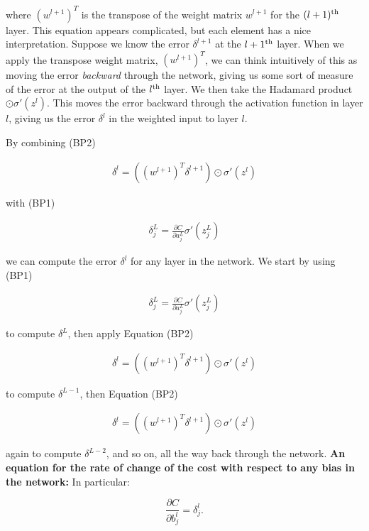 \noindent where $(w^{l+1})^T$ is the transpose of the weight matrix $w^{l+1}$ for the $(l+1)^{\rm th}$ layer. This equation appears complicated, but each element has a nice interpretation. Suppose we know the error $\delta^{l+1}$ at the $l+1^{\rm th}$ layer. When we apply the transpose weight matrix, $(w^{l+1})^T$, we can think intuitively of this as moving the error \emph{backward} through the network, giving us some sort of measure of the error at the output of the $l^{\rm th}$ layer. We then take the Hadamard product $\odot \sigma'(z^l)$. This moves the error backward through the activation function in layer $l$, giving us the error $\delta^l$ in the weighted input to layer $l$.


By combining (BP2)

\begin{align*}
\delta^l = ((w^{l+1})^T \delta^{l+1}) \odot \sigma'(z^l) \nonumber
\end{align*}

\noindent with (BP1)

\begin{align*}
\delta^L_j = \frac{\partial C}{\partial a^L_j} \sigma'(z^L_j) \nonumber
\end{align*}

\noindent we can compute the error $\delta^l$ for any layer in the network. We start by using (BP1)

\begin{align*}
\delta^L_j = \frac{\partial C}{\partial a^L_j} \sigma'(z^L_j) \nonumber
\end{align*}

\noindent to compute $\delta^L$, then apply Equation (BP2)

\begin{align*}
\delta^l = ((w^{l+1})^T \delta^{l+1}) \odot \sigma'(z^l) \nonumber
\end{align*}

\noindent to compute $\delta^{L-1}$, then Equation (BP2)

\begin{align*}
\delta^l = ((w^{l+1})^T \delta^{l+1}) \odot \sigma'(z^l) \nonumber
\end{align*}

\noindent again to compute $\delta^{L-2}$, and so on, all the way back through the network. \textbf{An equation for the rate of change of the cost with respect to any bias in the network:} In particular:

\begin{equation}
\frac{\partial C}{\partial b^l_j} = \delta^l_j.
\tag{BP3}
\end{equation}

